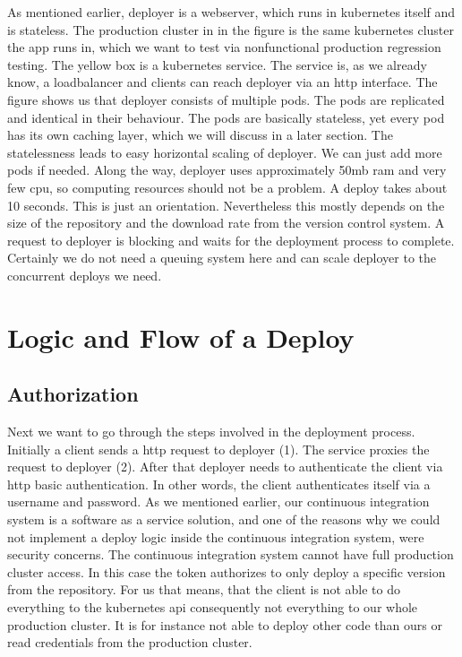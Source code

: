As mentioned earlier, deployer is a webserver, which runs in kubernetes itself and is
stateless. The production cluster in in the figure is the same kubernetes cluster the app
runs in, which we want to test via nonfunctional production regression testing. The yellow
box is a kubernetes service. The service is, as we already know, a loadbalancer and
clients can reach deployer via an http interface. The figure shows us that deployer
consists of multiple pods. The pods are replicated and identical in their behaviour. The
pods are basically stateless, yet every pod has its own caching layer, which we will
discuss in a later section. The statelessness leads to easy horizontal scaling of
deployer. We can just add more pods if needed. Along the way, deployer uses approximately
50mb ram and very few cpu, so computing resources should not be a problem. A deploy takes
about 10 seconds. This is just an orientation. Nevertheless this mostly depends on the
size of the repository and the download rate from the version control system. A request to
deployer is blocking and waits for the deployment process to complete. Certainly we do not
need a queuing system here and can scale deployer to the concurrent deploys we need.

\section{Logic and Flow of a Deploy}

\subsection{Authorization}

Next we want to go through the steps involved in the deployment process. Initially a
client sends a http request to deployer (1). The service proxies the request to deployer
(2). After that deployer needs to authenticate the client via http basic
authentication. In other words, the client authenticates itself via a username and
password. As we mentioned earlier, our continuous integration system is a software as a
service solution, and one of the reasons why we could not implement a deploy logic inside
the continuous integration system, were security concerns. The continuous integration
system cannot have full production cluster access. In this case the token authorizes to
only deploy a specific version from the repository. For us that means, that the client is
not able to do everything to the kubernetes api consequently not everything to our whole
production cluster. It is for instance not able to deploy other code than ours or read
credentials from the production cluster.

